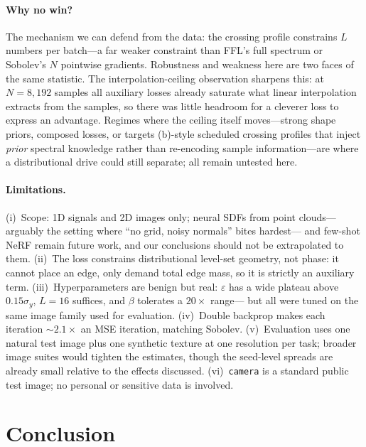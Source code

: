 \documentclass[10pt]{article}
\begin{document}
\paragraph{Why no win?\ } The mechanism we can defend from the data: the crossing
profile constrains $L$ numbers per batch---a far weaker constraint than FFL's full
spectrum or Sobolev's $N$ pointwise gradients. Robustness and weakness here are two
faces of the same statistic. The interpolation-ceiling observation sharpens this: at
$N{=}8{,}192$ samples all auxiliary losses already saturate what linear interpolation
extracts from the samples, so there was little headroom for a cleverer loss to
express an advantage. Regimes where the ceiling itself moves---strong shape priors,
composed losses, or targets (b)-style scheduled crossing profiles that inject
\emph{prior} spectral knowledge rather than re-encoding sample information---are where
a distributional drive could still separate; all remain untested here.

\paragraph{Limitations.} (i)~Scope: 1D signals and 2D images only; neural SDFs from
point clouds---arguably the setting where ``no grid, noisy normals'' bites hardest---%
and few-shot NeRF remain future work, and our conclusions should not be extrapolated
to them. (ii)~The loss constrains distributional level-set geometry, not phase: it
cannot place an edge, only demand total edge mass, so it is strictly an auxiliary
term. (iii)~Hyperparameters are benign but real: $\varepsilon$ has a wide plateau
above $0.15\sigma_y$, $L{=}16$ suffices, and $\beta$ tolerates a $20\times$ range---%
but all were tuned on the same image family used for evaluation. (iv)~Double backprop
makes each iteration ${\sim}2.1\times$ an MSE iteration, matching Sobolev.
(v)~Evaluation uses one natural test image plus one synthetic texture at one
resolution per task; broader image suites would tighten the estimates, though the
seed-level spreads are already small relative to the effects discussed.
(vi)~\texttt{camera} is a standard public test image; no personal or sensitive data
is involved.

\section{Conclusion}
\label{sec:conclusion}
\end{document}
